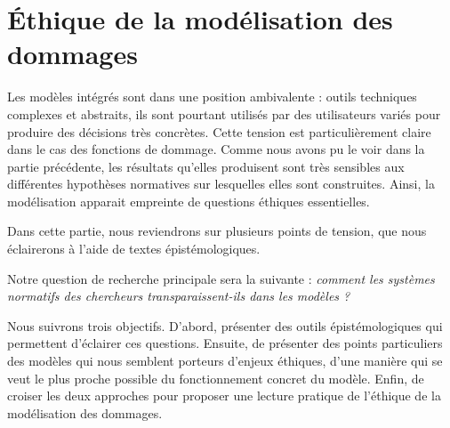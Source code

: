 \chapter{Éthique de la modélisation des dommages}
\label{chapter:ethique}
\newrefsegment




\newpage


Les modèles intégrés sont dans une position ambivalente : outils techniques complexes et abstraits, ils sont pourtant utilisés par des utilisateurs variés pour produire des décisions très concrètes. Cette tension est particulièrement claire dans le cas des fonctions de dommage. Comme nous avons pu le voir dans la partie précédente, les résultats qu'elles produisent sont très sensibles aux différentes hypothèses normatives sur lesquelles elles sont construites. Ainsi, la modélisation apparait empreinte de questions éthiques essentielles. 

Dans cette partie, nous reviendrons sur plusieurs points de tension, que nous éclairerons à l'aide de textes épistémologiques. 

Notre question de recherche principale sera la suivante : \textit{comment les systèmes normatifs des chercheurs transparaissent-ils dans les modèles ?}

Nous suivrons trois objectifs. D'abord, présenter des outils épistémologiques qui permettent d'éclairer ces questions. Ensuite, de présenter des points particuliers des modèles qui nous semblent porteurs d'enjeux éthiques, d'une manière qui se veut le plus proche possible du fonctionnement concret du modèle. Enfin, de croiser les deux approches pour proposer une lecture pratique de l'éthique de la modélisation des dommages. 

